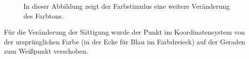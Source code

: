 \documentclass[11pt]{article}
\begin{document}
{\begin{minipage}[t]{0.6\textwidth}
\begin{figure}[H]
\caption{In dieser Abbildung zeigt der Farbstimulus eine weitere Veränderung des Farbtons.}
\label{blau5}
\end{figure}
\end{minipage}}

Für die Veränderung der Sättigung wurde der Punkt im Koordinatensystem von der ursprünglichen Farbe (in der Ecke für Blau im Farbdreieck) auf der Geraden zum Weißpunkt verschoben.

\end{document}

